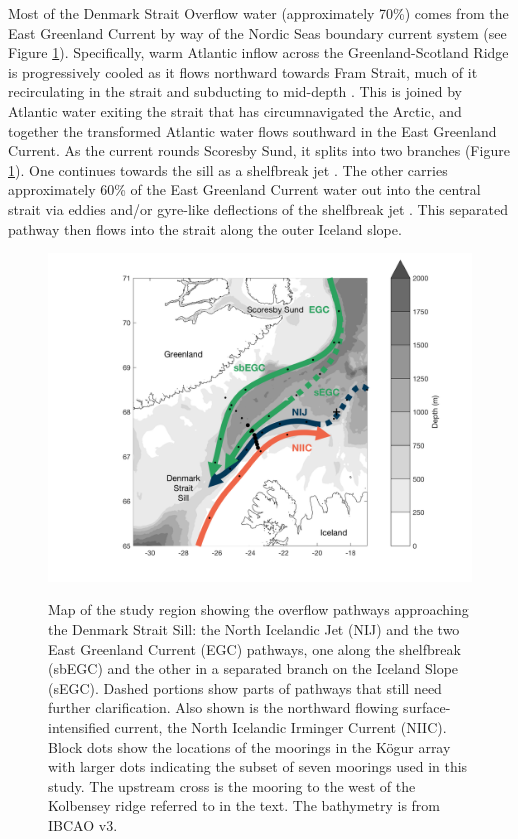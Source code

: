 \documentclass[12pt,titlepage,figuresatend]{article}
\begin{document}
Most of the Denmark Strait Overflow water (approximately 70\%) comes from the East Greenland Current by way of the Nordic Seas boundary current system \cite[]{Vage2013,Harden2016} (see Figure \ref{mainmap}). Specifically, warm Atlantic inflow across the Greenland-Scotland Ridge is progressively cooled as it flows northward towards Fram Strait, much of it recirculating in the strait and subducting to mid-depth \citep[]{Mauritzen1996}. This is joined by Atlantic water exiting the strait that has circumnavigated the Arctic, and together the transformed Atlantic water flows southward in the East Greenland Current.  As the current rounds Scoresby Sund, it splits into two branches (Figure \ref{mainmap}). One continues towards the sill as a shelfbreak jet \cite[]{Havik2017}. The other carries approximately 60\% of the East Greenland Current water out into the central strait via eddies and/or gyre-like deflections of the shelfbreak jet \cite[]{Vage2013,Harden2016}. This separated pathway then flows into the strait along the outer Iceland slope. 


\begin{figure}[p!]
  \centering\includegraphics[width=\hsize]{./figures/mainmap.pdf}
  \caption{Map of the study region showing the overflow pathways approaching the Denmark Strait Sill: the North Icelandic Jet (NIJ) and the two East Greenland Current (EGC) pathways, one along the shelfbreak (sbEGC) and the other in a separated branch on the Iceland Slope (sEGC). Dashed portions show parts of pathways that still need further clarification. Also shown is the northward flowing surface-intensified current, the North Icelandic Irminger Current (NIIC). Block dots show the locations of the moorings in the K\"{o}gur array with larger dots indicating the subset of seven moorings used in this study. The upstream cross is the mooring to the west of the Kolbensey ridge referred to in the text. The bathymetry is from IBCAO v3.}{\label{mainmap}}
\end{figure}
\end{document}
